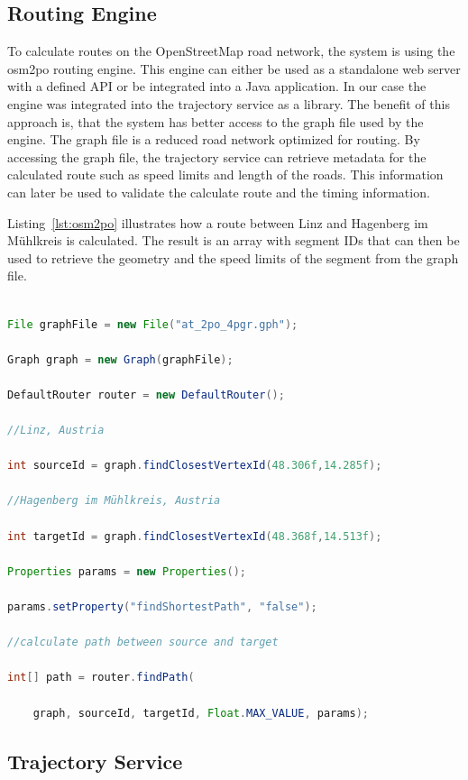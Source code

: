 \documentclass[master,english]{hgbthesis}
\begin{document}
\subsection{Routing Engine}

To calculate routes on the OpenStreetMap road network, the system is using the osm2po routing engine. This engine can either be used as a standalone web server with a defined API or be integrated into a Java application. In our case the engine was integrated into the trajectory service as a library. The benefit of this approach is, that the system has better access to the graph file used by the engine. The graph file is a reduced road network optimized for routing. By accessing the graph file, the trajectory service can retrieve metadata for the calculated route such as speed limits and length of the roads. This information can later be used to validate the calculate route and the timing information. 

Listing~\ref{lst:osm2po} illustrates how a route between Linz and Hagenberg im Mühlkreis is calculated. The result is an array with segment IDs that can then be used to retrieve the geometry and the speed limits of the segment from the graph file.

\begin{lstlisting}[language=Java,style=JAVA,caption={Example code to calculate a route between two points},label={lst:osm2po}]

File graphFile = new File("at_2po_4pgr.gph");

Graph graph = new Graph(graphFile);

DefaultRouter router = new DefaultRouter();

//Linz, Austria

int sourceId = graph.findClosestVertexId(48.306f,14.285f);

//Hagenberg im Mühlkreis, Austria

int targetId = graph.findClosestVertexId(48.368f,14.513f);

Properties params = new Properties();

params.setProperty("findShortestPath", "false");

//calculate path between source and target

int[] path = router.findPath(

    graph, sourceId, targetId, Float.MAX_VALUE, params);

\end{lstlisting}

\subsection{Trajectory Service}
\end{document}
